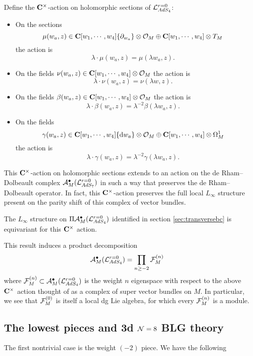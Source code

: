 \documentclass[../main.tex]{subfiles}
\begin{document}
Define the $\mathbf{C}^\times$-action on holomorphic sections of $\mathcal L_{AdS_4}^{r=0}$:
\begin{itemize}
\item On the sections 
\[
\mu(w_a,z) \in \mathbf{C}[w_1, \cdots, w_4]\{\partial_{w_a}\} \otimes \mathcal O_M \oplus \mathbf{C}[w_1, \cdots, w_4]\otimes T_M \] 
the action is
\[
\lambda \cdot \mu(w_a,z) = \mu(\lambda w_a , z).
\]
\item On the fields $\nu(w_a,z) \in \mathbf{C}[w_1, \cdots, w_4] \otimes \mathcal O_M$ the action is
\[
\lambda \cdot \nu(w_a,z) = \nu(\lambda w , z).
\]
\item On the fields $\beta(w_a,z) \in  \mathbf{C}[w_1, \cdots, w_4] \otimes \mathcal O_M$ the action is
\[
\lambda \cdot \beta(w_a,z) = \lambda^{-2} \beta(\lambda w_a , z).
\]
\item On the fields 
\[
\gamma(w_a,z) \in  \mathbf{C}[w_1, \cdots, w_4] \{\mathrm{d} w_a\} \otimes \mathcal O_M \oplus  \mathbf{C}[w_1, \cdots, w_4] \otimes \Omega^1_M
\] 
the action is
\[
\lambda \cdot \gamma(w_a,z) = \lambda^{-2} \gamma(\lambda w _a, z).
\]
\end{itemize}

This $\mathbf{C}^\times$-action on holomorphic sections extends to an action on the de Rham--Dolbeault complex $\mathcal A^\bullet_M(\mathcal L_{AdS_7}^{r=0})$ in such a way that preserves the de Rham--Dolbeault operator.
In fact, this $\mathbf{C}^\times$-action preserves the full local $L_\infty$ structure present on the parity shift of this complex of vector bundles.

\begin{prop}\label{prop:ads4decomp}
The $L_\infty$ structure on $\Pi \mathcal A_M^\bullet(\mathcal{L}^{r=0}_{AdS_4} )$ identified in section \ref{sec:transversebc} is equivariant for this $\mathbf{C}^\times$ action.
\end{prop}

This result induces a product decomposition 
\[
 \mathcal A_M^\bullet(\mathcal{L}^{r=0}_{AdS_4} ) = \prod _{n\geq -2} \mathcal{F}^{(n)}_{M}
\]
where $\mathcal F^{(n)}_M \subset \mathcal A_M^\bullet(\mathcal{L}^{r=0}_{AdS_4} )$ is the weight $n$ eigenspace with respect to the above $\mathbf{C}^\times$ action thought of as a complex of super vector bundles on $M$. 
In particular, we see that $\mathcal{F}^{(0)}_{M}$ is itself a local dg Lie algebra, for which  every $\mathcal{F}^{(n)}_{M}$ is a module.

\subsection{The lowest pieces and 3d $\mathcal{N}=8$ BLG theory}\label{sec:BLG}
\parsec[] The first nontrivial case is the weight ${(-2)}$ piece. We have the following
\end{document}
